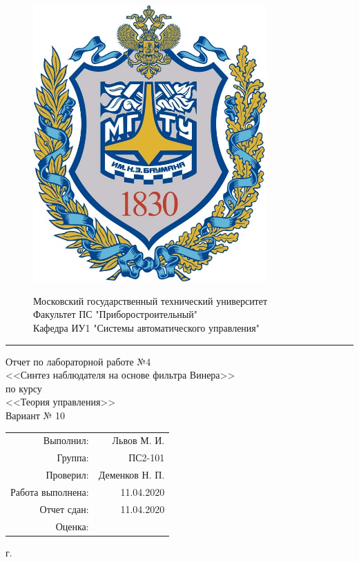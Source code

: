 \begin{center}
	\begin{figure}[h]
		\begin{minipage}[h]{0.2\textwidth}
			\includegraphics[width=0.8\textwidth]{bmstu.png}
		\end{minipage}
		\begin{minipage}[h]{0.9\textwidth}
			\large \center Московский государственный технический университет\\
			Факультет ПС "Приборостроительный"\\
			Кафедра ИУ1 "Системы автоматического управления"
		\end{minipage}
		
	\end{figure}
	\rule{18cm}{0.8pt}
	Отчет по лабораторной работе №4\\
	\vspace{2pt}
	<<Синтез наблюдателя на основе фильтра Винера>>\\
	\vspace{2pt}
	по курсу\\
	\vspace{2pt}
	<<Теория управления>>\\
	\vspace{0.8pt}
	Вариант № 10
	\vspace{7cm}
	\flushright \begin{tabular}{rr}
		Выполнил: & Львов М. И. \\
		Группа: & ПС2-101 \\
		Проверил: & Деменков Н. П.\\
		Работа выполнена: &  11.04.2020\\
		Отчет сдан: & 11.04.2020\\
		Оценка: &
	\end{tabular}
	
	\vfill
	 г.
\end{center}
\clearpage